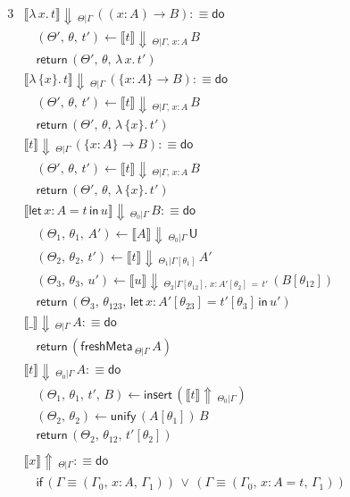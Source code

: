 \documentclass[acmsmall,review,anonymous,prologue,dvipsnames]{acmart}\settopmatter{printfolios=true,printccs=false,printacmref=false}
\newcommand{\slet}{\boldsymbol{\mathsf{let}}}
\renewcommand{\sin}{\boldsymbol{\mathsf{in}}}
\renewcommand{\U}{\mathsf{U}}
\newcommand{\freshMeta}[3]{\mathsf{freshMeta}\,_{#1|#2}\,#3}
\newcommand{\unify}{\mathsf{unify}}
\newcommand{\echeck}[4]{\llbracket#1\rrbracket\!\Downarrow\,_{#2|#3}\,#4}
\newcommand{\einfer}[3]{\llbracket#1\rrbracket\!\Uparrow\,_{#2|#3}}
\newcommand{\edo}{\boldsymbol{\mathsf{do}}}
\newcommand{\ereturn}{\boldsymbol{\mathsf{return}}}
\newcommand{\eif}{\boldsymbol{\mathsf{if}}}
\newcommand{\einsert}{\mathsf{insert}}
\theoremstyle{remark}
\begin{document}
\begin{alignat*}{3}
  &\echeck{\lambda\,x.\,t}{\Theta}{\Gamma}{((x : A)\to B)} :\equiv \edo \\
  &\quad(\Theta',\,\theta,\,t') \leftarrow \echeck{t}{\Theta}{\Gamma,\,x:A} B\\
  &\quad\ereturn\,(\Theta',\,\theta,\,\lambda\,x.\,t')\\
  &\echeck{\lambda\,\{x\}.\,t}{\Theta}{\Gamma}{(\{x : A\}\to B)} :\equiv \edo \\
  &\quad(\Theta',\,\theta,\,t') \leftarrow \echeck{t}{\Theta}{\Gamma,\,x:A} B\\
  &\quad\ereturn\,(\Theta',\,\theta,\,\lambda\,\{x\}.\,t')\\
  &\echeck{t}{\Theta}{\Gamma}{(\{x : A\}\to B)} : \equiv \edo \\
  &\quad (\Theta',\,\theta,\,t') \leftarrow \echeck{t}{\Theta}{\Gamma,\,x:A} B\\
  &\quad \ereturn\,(\Theta',\,\theta,\,\lambda\,\{x\}.\,t')\\
  &\echeck{\slet\,x:A=t\,\sin\,u}{\Theta_0}{\Gamma}{B} :\equiv \edo \\
  &\quad(\Theta_1,\,\theta_1,\,A') \leftarrow \echeck{A}{\Theta_0}{\Gamma}{\U}\\
  &\quad(\Theta_2,\,\theta_2,\,t') \leftarrow \echeck{t}
                {\Theta_1}{\Gamma[\theta_1]}{A'}\\
  &\quad(\Theta_3,\,\theta_3,\,u') \leftarrow
                \echeck{u}{\Theta_2}{\Gamma[\theta_{12}],\,x:A'[\theta_2]\,=\,t'}{(B[\theta_{12}])}\\
  &\quad\ereturn\,(\Theta_3,\,\theta_{123},\,\slet\,x:A'[\theta_{23}]=t'[\theta_3]\,\sin\,u')\\
  &\echeck{\_}{\Theta}{\Gamma}{A} :\equiv \edo \\
  &\quad\ereturn\,(\freshMeta{\Theta}{\Gamma}{A})\\
  &\echeck{t}{\Theta_0}{\Gamma}{A} :\equiv \edo \\
  &\quad(\Theta_1,\,\theta_1,\,t',\,B) \leftarrow \einsert\,(\einfer{t}{\Theta_0}{\Gamma})\\
  &\quad(\Theta_2,\,\theta_2) \leftarrow \unify\,(A[\theta_1])\,B\\
  &\quad\ereturn\,(\Theta_2,\,\theta_{12},\,t'[\theta_2])\\\\
  &\einfer{x}{\Theta}{\Gamma} :\equiv \edo\\
  &\quad\eif\,(\Gamma \equiv (\Gamma_0,\,x : A,\,\Gamma_1))\,\lor\,(\Gamma \equiv (\Gamma_0,\,x : A = t,\,\Gamma_1)) \\

\end{alignat*}
\end{document}
